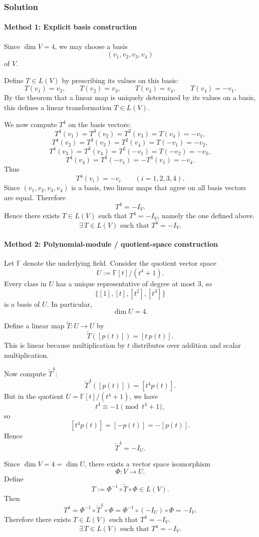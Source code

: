 \documentclass[12pt]{article}
\begin{document}
\subsubsection{Solution}

\paragraph{Method 1: Explicit basis construction}
Since \(\dim V=4\), we may choose a basis
\[
(v_1,v_2,v_3,v_4)
\]
of \(V\).

Define \(T\in L(V)\) by prescribing its values on this basis:
\[
T(v_1)=v_2,\qquad
T(v_2)=v_3,\qquad
T(v_3)=v_4,\qquad
T(v_4)=-v_1.
\]
By the theorem that a linear map is uniquely determined by its values on a basis, this defines a linear transformation \(T\in L(V)\).

We now compute \(T^4\) on the basis vectors:
\[
T^4(v_1)=T^3(v_2)=T^2(v_3)=T(v_4)=-v_1,
\]
\[
T^4(v_2)=T^3(v_3)=T^2(v_4)=T(-v_1)=-v_2,
\]
\[
T^4(v_3)=T^3(v_4)=T^2(-v_1)=T(-v_2)=-v_3,
\]
\[
T^4(v_4)=T^3(-v_1)=-T^3(v_1)=-v_4.
\]
Thus
\[
T^4(v_i)=-v_i\qquad (i=1,2,3,4).
\]
Since \((v_1,v_2,v_3,v_4)\) is a basis, two linear maps that agree on all basis vectors are equal. Therefore
\[
T^4=-I_V.
\]
Hence there exists \(T\in L(V)\) such that \(T^4=-I_V\), namely the one defined above.
\[
\boxed{\exists\,T\in L(V)\text{ such that }T^4=-I_V.}
\]

\newpage
\paragraph{Method 2: Polynomial-module / quotient-space construction}
Let \(\mathbb F\) denote the underlying field. Consider the quotient vector space
\[
U:=\mathbb F[t]/(t^4+1).
\]
Every class in \(U\) has a unique representative of degree at most \(3\), so
\[
\{[1],[t],[t^2],[t^3]\}
\]
is a basis of \(U\). In particular,
\[
\dim U=4.
\]

Define a linear map \(\widetilde T:U\to U\) by
\[
\widetilde T([p(t)])=[t\,p(t)].
\]
This is linear because multiplication by \(t\) distributes over addition and scalar multiplication.

Now compute \(\widetilde T^4\):
\[
\widetilde T^4([p(t)])=[t^4p(t)].
\]
But in the quotient \(U=\mathbb F[t]/(t^4+1)\), we have
\[
t^4\equiv -1 \pmod{t^4+1},
\]
so
\[
[t^4p(t)]=[-p(t)]=-[p(t)].
\]
Hence
\[
\widetilde T^4=-I_U.
\]

Since \(\dim V=4=\dim U\), there exists a vector space isomorphism
\[
\Phi:V\to U.
\]
Define
\[
T:=\Phi^{-1}\circ \widetilde T\circ \Phi\in L(V).
\]
Then
\[
T^4
=\Phi^{-1}\circ \widetilde T^4\circ \Phi
=\Phi^{-1}\circ (-I_U)\circ \Phi
=-I_V.
\]
Therefore there exists \(T\in L(V)\) such that \(T^4=-I_V\).
\[
\boxed{\exists\,T\in L(V)\text{ such that }T^4=-I_V.}
\]
\end{document}
